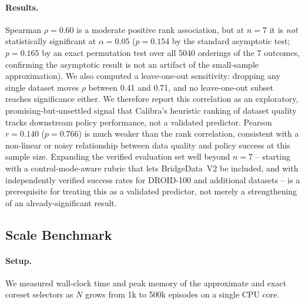 \documentclass[10pt,twocolumn]{article}
\begin{document}
\paragraph{Results.}
Spearman $\rho = 0.60$ is a moderate positive rank association, but at
$n = 7$ it is \emph{not} statistically significant at $\alpha = 0.05$
($p = 0.154$ by the standard asymptotic test; $p = 0.165$ by an exact
permutation test over all 5040 orderings of the 7 outcomes, confirming the
asymptotic result is not an artifact of the small-sample approximation). We
also computed a leave-one-out sensitivity: dropping any single dataset moves
$\rho$ between 0.41 and 0.71, and no leave-one-out subset reaches
significance either. We therefore report this correlation as an exploratory,
promising-but-unsettled signal that Calibra's heuristic ranking of dataset
quality tracks downstream policy performance, not a validated predictor.
Pearson $r = 0.140$ ($p = 0.766$) is much weaker than the rank correlation,
consistent with a non-linear or noisy relationship between data quality and
policy success at this sample size. Expanding the verified evaluation set
well beyond $n = 7$ -- starting with a control-mode-aware rubric that lets
BridgeData~V2 be included, and with independently verified success rates for
DROID-100 and additional datasets -- is a prerequisite for treating this as a
validated predictor, not merely a strengthening of an already-significant
result.

\subsection{Scale Benchmark}
\label{sec:scale}

\paragraph{Setup.}
We measured wall-clock time and peak memory of the approximate and exact
coreset selectors as $N$ grows from 1k to 500k episodes on a single CPU core.

\begin{table}[h]
\centering
\caption{Approximate selector runtime and memory (keep 30\%, batch size 1000, single CPU core).}
\label{tab:scale}
\small
{}
\end{table}
\end{document}
